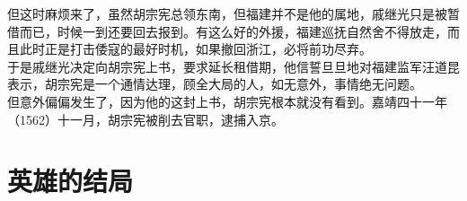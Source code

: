 \begin{multicols}{\theparacolNo}
但这时麻烦来了，虽然胡宗宪总领东南，但福建并不是他的属地，戚继光只是被暂借而已，时候一到还要回去报到。有这么好的外援，福建巡抚自然舍不得放走，而且此时正是打击倭寇的最好时机，如果撤回浙江，必将前功尽弃。\\

于是戚继光决定向胡宗宪上书，要求延长租借期，他信誓旦旦地对福建监军汪道昆表示，胡宗宪是一个通情达理，顾全大局的人，如无意外，事情绝无问题。\\

但意外偏偏发生了，因为他的这封上书，胡宗宪根本就没有看到。嘉靖四十一年（1562）十一月，胡宗宪被削去官职，逮捕入京。\\
\ifnum{}
	\end{multicols}
\fi
\newpage
\section{英雄的结局}
\ifnum{}
